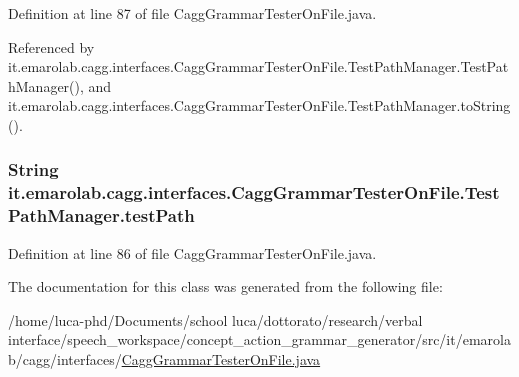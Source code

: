 Definition at line 87 of file Cagg\-Grammar\-Tester\-On\-File.\-java.



Referenced by it.\-emarolab.\-cagg.\-interfaces.\-Cagg\-Grammar\-Tester\-On\-File.\-Test\-Path\-Manager.\-Test\-Path\-Manager(), and it.\-emarolab.\-cagg.\-interfaces.\-Cagg\-Grammar\-Tester\-On\-File.\-Test\-Path\-Manager.\-to\-String().

\hypertarget{classit_1_1emarolab_1_1cagg_1_1interfaces_1_1CaggGrammarTesterOnFile_1_1TestPathManager_a4af055419a5793409f9e49ab20908645}{
\subsubsection[{test\-Path}]{\setlength{\rightskip}{0pt plus 5cm}String it.\-emarolab.\-cagg.\-interfaces.\-Cagg\-Grammar\-Tester\-On\-File.\-Test\-Path\-Manager.\-test\-Path\hspace{0.3cm}{\ttfamily [private]}}}\label{classit_1_1emarolab_1_1cagg_1_1interfaces_1_1CaggGrammarTesterOnFile_1_1TestPathManager_a4af055419a5793409f9e49ab20908645}


Definition at line 86 of file Cagg\-Grammar\-Tester\-On\-File.\-java.



The documentation for this class was generated from the following file\-:\begin{DoxyCompactItemize}
\item 
/home/luca-\/phd/\-Documents/school luca/dottorato/research/verbal interface/speech\-\_\-workspace/concept\-\_\-action\-\_\-grammar\-\_\-generator/src/it/emarolab/cagg/interfaces/\hyperlink{CaggGrammarTesterOnFile_8java}{Cagg\-Grammar\-Tester\-On\-File.\-java}\end{DoxyCompactItemize}
